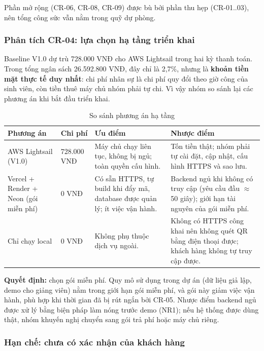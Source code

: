 Phần mở rộng (CR-06, CR-08, CR-09) được bù bởi phần thu hẹp (CR-01..03), nên tổng công sức vẫn nằm trong quỹ dự phòng.

\subsubsection{Phân tích CR-04: lựa chọn hạ tầng triển khai}

Baseline V1.0 dự trù 728.000 VNĐ cho AWS Lightsail trong hai kỳ thanh toán. Trong tổng ngân sách 26.592.800 VNĐ, đây chỉ là 2,7\%, nhưng là \textbf{khoản tiền mặt thực tế duy nhất}: chi phí nhân sự là chi phí quy đổi theo giờ công của sinh viên, còn tiền thuê máy chủ nhóm phải tự chi. Vì vậy nhóm so sánh lại các phương án khi bắt đầu triển khai.

\begin{table}[H]
\centering\small
\caption{So sánh phương án hạ tầng}\label{tab:t3-cr04-options}
\begin{tabularx}{\linewidth}{@{}p{.17\linewidth}p{.13\linewidth}XX@{}}
\toprule
\textbf{Phương án} & \textbf{Chi phí} & \textbf{Ưu điểm} & \textbf{Nhược điểm}\\\midrule
AWS Lightsail (V1.0) & 728.000 VNĐ & Máy chủ chạy liên tục, không bị ngủ; toàn quyền cấu hình. & Tốn tiền thật; nhóm phải tự cài đặt, cập nhật, cấu hình HTTPS và sao lưu.\\
Vercel + Render + Neon (gói miễn phí) & 0 VNĐ & Có sẵn HTTPS, tự build khi đẩy mã, database được quản lý; ít việc vận hành. & Backend ngủ khi không có truy cập (yêu cầu đầu $\approx$ 50 giây); giới hạn tài nguyên của gói miễn phí.\\
Chỉ chạy local & 0 VNĐ & Không phụ thuộc dịch vụ ngoài. & Không có HTTPS công khai nên không quét QR bằng điện thoại được; khách hàng không tự truy cập được.\\
\bottomrule
\end{tabularx}
\end{table}

\noindent\textbf{Quyết định:} chọn gói miễn phí. Quy mô sử dụng trong dự án (dữ liệu giả lập, demo cho giảng viên) nằm trong giới hạn gói miễn phí, và gói này giảm việc vận hành, phù hợp khi thời gian đã bị rút ngắn bởi CR-05. Nhược điểm backend ngủ được xử lý bằng biện pháp làm nóng trước demo (NR1); nếu hệ thống được dùng thật, nhóm khuyến nghị chuyển sang gói trả phí hoặc máy chủ riêng.

\subsubsection{Hạn chế: chưa có xác nhận của khách hàng}
\label{sec:t3-limitation-review}

